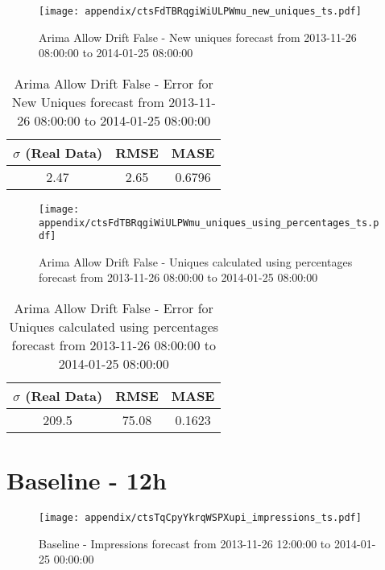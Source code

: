 \begin{figure}[H] \begin{center} \leavevmode
\texttt{[image: appendix/ctsFdTBRqgiWiULPWmu\_new\_uniques\_ts.pdf]} \caption[]{
Arima Allow Drift False - New uniques forecast from 2013-11-26 08:00:00 to 2014-01-25 08:00:00} \label{fig:appendix/ctsFdTBRqgiWiULPWmu_new_uniques_ts.pdf} \end{center}
\end{figure}

\begin{table}[H]
\centering
\footnotesize
\begin{tabular}{ccc}
$\sigma$ (Real Data) & RMSE & MASE   \\ \hline
2.47 & 2.65 & 0.6796 \\
\end{tabular}

\vspace{0.5cm}

\caption[]{
Arima Allow Drift False - Error for New Uniques forecast from 2013-11-26 08:00:00 to 2014-01-25 08:00:00}
\end{table}

\begin{figure}[H] \begin{center} \leavevmode
\texttt{[image: appendix/ctsFdTBRqgiWiULPWmu\_uniques\_using\_percentages\_ts.pdf]} \caption[]{
Arima Allow Drift False - Uniques calculated using percentages forecast from 2013-11-26 08:00:00 to 2014-01-25 08:00:00} \label{fig:appendix/ctsFdTBRqgiWiULPWmu_uniques_using_percentages_ts.pdf} \end{center}
\end{figure}

\begin{table}[H]
\centering
\footnotesize
\begin{tabular}{ccc}
$\sigma$ (Real Data) & RMSE & MASE   \\ \hline
209.5 & 75.08 & 0.1623 \\
\end{tabular}

\vspace{0.5cm}

\caption[]{
Arima Allow Drift False - Error for Uniques calculated using percentages forecast from 2013-11-26 08:00:00 to 2014-01-25 08:00:00}
\end{table}

\section{Baseline - 12h}
\begin{figure}[H] \begin{center} \leavevmode
\texttt{[image: appendix/ctsTqCpyYkrqWSPXupi\_impressions\_ts.pdf]} \caption[]{
Baseline - Impressions forecast from 2013-11-26 12:00:00 to 2014-01-25 00:00:00} \label{fig:appendix/ctsTqCpyYkrqWSPXupi_impressions_ts.pdf} \end{center}
\end{figure}

